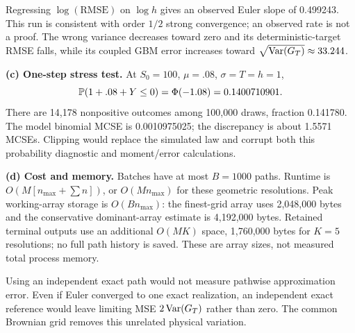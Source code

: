 Regressing $\log(\mathrm{RMSE})$ on $\log h$ gives an observed Euler slope of 0.499243. This run is consistent with order $1/2$ strong convergence; an observed rate is not a proof. The wrong variance decreases toward zero and its deterministic-target RMSE falls, while its coupled GBM error increases toward $\sqrt{\operatorname{Var}(G_T)}\approx33.244$.

\textbf{(c) One-step stress test.} At $S_0=100$, $\mu=.08$, $\sigma=T=h=1$,
\[
 \mathbb P(1+.08+Y\leq0)=\Phi(-1.08)=0.1400710901.
\]
There are 14,178 nonpositive outcomes among 100,000 draws, fraction 0.141780. The model binomial MCSE is 0.0010975025; the discrepancy is about 1.5571 MCSEs. Clipping would replace the simulated law and corrupt both this probability diagnostic and moment/error calculations.

\textbf{(d) Cost and memory.} Batches have at most $B=1000$ paths. Runtime is $O(M[n_{\max}+\sum n])$, or $O(Mn_{\max})$ for these geometric resolutions. Peak working-array storage is $O(Bn_{\max})$: the finest-grid array uses 2,048,000 bytes and the conservative dominant-array estimate is 4,192,000 bytes. Retained terminal outputs use an additional $O(MK)$ space, 1,760,000 bytes for $K=5$ resolutions; no full path history is saved. These are array sizes, not measured total process memory.

Using an independent exact path would not measure pathwise approximation error. Even if Euler converged to one exact realization, an independent exact reference would leave limiting MSE $2\operatorname{Var}(G_T)$ rather than zero. The common Brownian grid removes this unrelated physical variation.
\clearpage
{}
